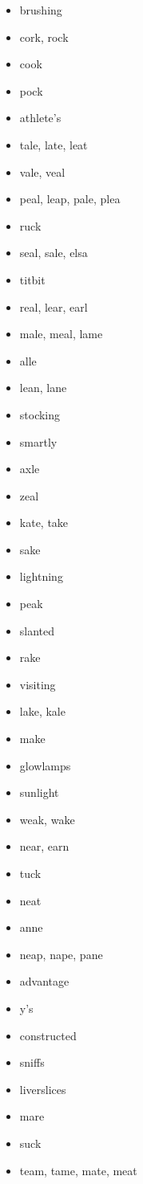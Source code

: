 \documentclass{article}
\begin{document}
\begin{itemize}
    \item brushing
    \item cork, rock
    \item cook
    \item pock
    \item athlete's
    \item tale, late, leat
    \item vale, veal
    \item peal, leap, pale, plea
    \item ruck
    \item seal, sale, elsa
    \item titbit
    \item real, lear, earl
    \item male, meal, lame
    \item alle
    \item lean, lane
    \item stocking
    \item smartly
    \item axle
    \item zeal
    \item kate, take
    \item sake
    \item lightning
    \item peak
    \item slanted
    \item rake
    \item visiting
    \item lake, kale
    \item make
    \item glowlamps
    \item sunlight
    \item weak, wake
    \item near, earn
    \item tuck
    \item neat
    \item anne
    \item neap, nape, pane
    \item advantage
    \item y's
    \item constructed
    \item sniffs
    \item liverslices
    \item mare
    \item suck
    \item team, tame, mate, meat

\end{itemize}
\end{document}
